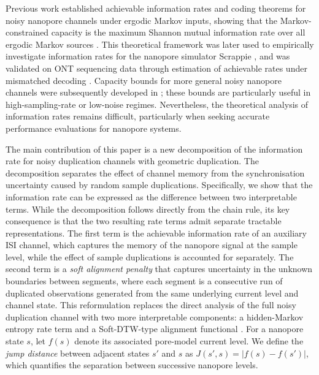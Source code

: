 \documentclass[onecolumn]{IEEEtran}
\theoremstyle{definition}
\begin{document}
Previous work established achievable information rates and coding theorems for
noisy nanopore channels under ergodic Markov inputs, showing that the
Markov-constrained capacity is the maximum Shannon mutual information rate over
all ergodic Markov sources \cite{McBain2024b}. This theoretical framework was
later used to empirically investigate information rates for the nanopore
simulator Scrappie \cite{McBain2024a}, and was validated on ONT sequencing
data through estimation of achievable rates under mismatched decoding
\cite{McBain2025JSAIT}. Capacity bounds for more general noisy nanopore
channels were subsequently developed in \cite{Rameshwar2025}; these bounds are
particularly useful in high-sampling-rate or low-noise regimes. Nevertheless,
the theoretical analysis of information rates remains difficult, particularly
when seeking accurate performance evaluations for nanopore systems.

The main contribution of this paper is a new decomposition of the information
rate for noisy duplication channels with geometric duplication. The
decomposition separates the effect of channel memory from the synchronisation
uncertainty caused by random sample duplications. Specifically, we show that
the information rate can be expressed as the difference between two
interpretable terms. {
While the decomposition follows directly from the chain rule, its key consequence is that the two resulting rate terms admit separate tractable
representations.} The first term is the achievable information rate of an auxiliary ISI channel,
which captures the memory of the nanopore signal at the sample level, while
the effect of sample duplications is accounted for separately. The second term
is a {\em soft alignment penalty} that captures uncertainty in the unknown boundaries
between segments, where each segment is a consecutive run of duplicated
observations generated from the same underlying current level and channel
state. This reformulation
replaces the direct analysis of the full noisy duplication channel with two more interpretable components: a hidden-Markov entropy rate term
\cite{CoverThomas} and a Soft-DTW-type alignment functional
\cite{Cuturi2017}. {For a nanopore state $s$, let $f(s)$ denote its associated
pore-model current level. We define the \emph{jump distance} between adjacent
states $s'$ and $s$ as
$J(s',s)=|f(s)-f(s')|$, which quantifies the separation between successive
nanopore levels.}
\end{document}
